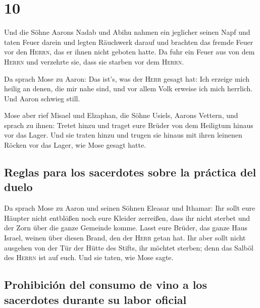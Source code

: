 \hypertarget{section-9}{%
\section{10}\label{section-9}}

 Und die Söhne Aarons Nadab und Abihu nahmen ein jeglicher
seinen Napf und taten Feuer darein und legten Räuchwerk darauf und
brachten das fremde Feuer vor den \textsc{Herrn}, das er ihnen nicht
geboten hatte.  Da fuhr ein Feuer aus von dem
\textsc{Herrn} und verzehrte sie, dass sie starben vor dem
\textsc{Herrn}.

 Da sprach Mose zu Aaron: Das ist's, was der \textsc{Herr}
gesagt hat: Ich erzeige mich heilig an denen, die mir nahe sind, und vor
allem Volk erweise ich mich herrlich. Und Aaron schwieg still.

 Mose aber rief Misael und Elzaphan, die Söhne Usiels,
Aarons Vettern, und sprach zu ihnen: Tretet hinzu und traget eure Brüder
von dem Heiligtum hinaus vor das Lager.  Und sie traten
hinzu und trugen sie hinaus mit ihren leinenen Röcken vor das Lager, wie
Mose gesagt hatte.

\hypertarget{reglas-para-los-sacerdotes-sobre-la-pruxe1ctica-del-duelo}{%
\subsection{Reglas para los sacerdotes sobre la práctica del
duelo}\label{reglas-para-los-sacerdotes-sobre-la-pruxe1ctica-del-duelo}}

 Da sprach Mose zu Aaron und seinen Söhnen Eleasar und
Ithamar: Ihr sollt eure Häupter nicht entblößen noch eure Kleider
zerreißen, dass ihr nicht sterbet und der Zorn über die ganze Gemeinde
komme. Lasst eure Brüder, das ganze Haus Israel, weinen über diesen
Brand, den der \textsc{Herr} getan hat.  Ihr aber sollt
nicht ausgehen von der Tür der Hütte des Stifts, ihr möchtet sterben;
denn das Salböl des \textsc{Herrn} ist auf euch. Und sie taten, wie Mose
sagte.

\hypertarget{prohibiciuxf3n-del-consumo-de-vino-a-los-sacerdotes-durante-su-labor-oficial}{%
\subsection{Prohibición del consumo de vino a los sacerdotes durante su
labor
oficial}\label{prohibiciuxf3n-del-consumo-de-vino-a-los-sacerdotes-durante-su-labor-oficial}}

